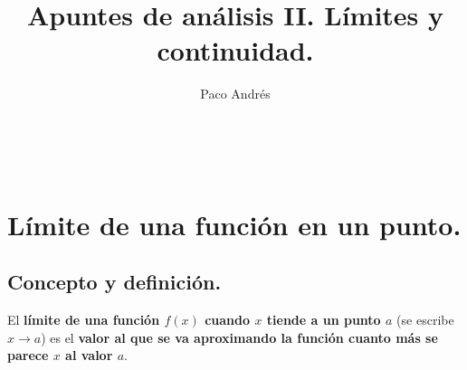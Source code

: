 \documentclass[a4paper,11pt,answers]{exam}
\def \autor{Paco Andrés}
\def \titulo{Apuntes de análisis II. Límites y continuidad.}
\begin{document}
\title{\titulo}
\date{}
\author{\autor}
\maketitle

\begin{center}
\doclicenseLongText\\
\vspace{.25cm}
\doclicenseImage
\end{center}

\section{Límite de una función en un punto.}
\subsection{Concepto y definición.}
El \textbf{límite de una función $f(x)$ cuando $x$ tiende a un punto $a$} (se escribe $x \to a$) es el \textbf{valor al que se va aproximando la función cuanto más se parece $x$ al valor $a$}.\\
\end{document}
